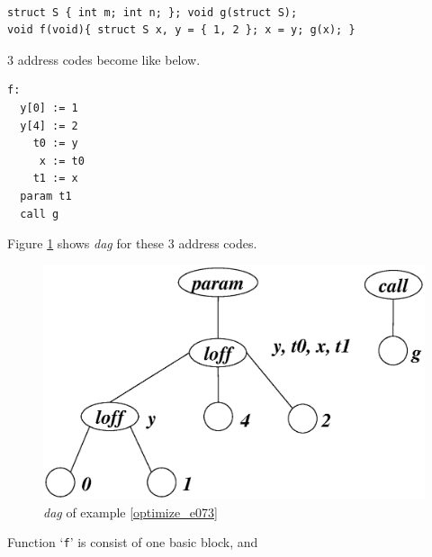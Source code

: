 \begin{Example}
\label{optimize_e073}
\begin{verbatim}

struct S { int m; int n; }; void g(struct S);
void f(void){ struct S x, y = { 1, 2 }; x = y; g(x); }
\end{verbatim}
3 address codes become like below.
\begin{verbatim}
f:
  y[0] := 1
  y[4] := 2
    t0 := y
     x := t0
    t1 := x
  param t1
  call g
\end{verbatim}
Figure \ref{optimize_e074} shows {\em dag} for these 3 address codes.
\begin{figure}[htbp]
\begin{center}
\includegraphics[width=1.2\linewidth,height=1.0\linewidth]{opt030.eps}
\caption{{\em dag} of example \ref{optimize_e073}}
\label{optimize_e074}
\end{center}
\end{figure}
Function `{\tt{f}}' is consist of one basic block, and 

\end{Example}
